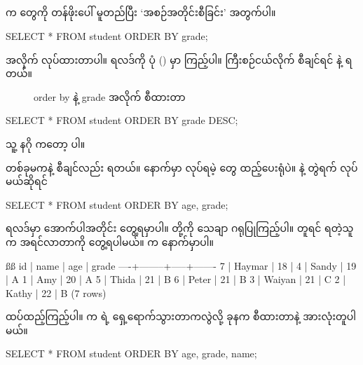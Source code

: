 \subsection*{}
 က  တွေကို  တန်ဖိုးပေါ် မူတည်ပြီး ‘အစဉ်အတိုင်းစီခြင်း’  အတွက်ပါ။
%
\begin{sql}
SELECT * FROM student ORDER BY grade;
\end{sql}
%
 အလိုက်  လုပ်ထားတာပါ။ ရလဒ်ကို ပုံ (\fRefNo{\ref{fig:orderbyasc}}) မှာ ကြည့်ပါ။ ကြီးစဉ်ငယ်လိုက် စီချင်ရင်   နဲ့ ရတယ်။
\begin{figure}[tbh!]
\caption{order by နဲ့ grade အလိုက် စီထားတာ} 
\label{fig:orderbyasc}
\end{figure}
%
\begin{sql}
SELECT * FROM student ORDER BY grade DESC;
\end{sql}
%
သူ့ နဂို  ကတော့   ပါ။ 

 တစ်ခုမကနဲ့  စီချင်လည်း ရတယ်။  နောက်မှာ  လုပ်ရမဲ့  တွေ ထည့်ပေးရုံပဲ။  နဲ့  တွဲရက်  လုပ်မယ်ဆိုရင်
%
\begin{sql}
SELECT * FROM student ORDER BY age, grade;
\end{sql}
%
 ရလဒ်မှာ အောက်ပါအတိုင်း တွေ့ရမှာပါ။  တို့ကို သေချာ ဂရုပြုကြည့်ပါ။  တူရင်  ရတဲ့သူက အရင်လာတာကို တွေ့ရပါမယ်။  က နောက်မှာပါ။
\begin{vbtm}
ßß
 id |  name  | age | grade
----+--------+-----+-------
  7 | Haymar |  18 |
  4 | Sandy  |  19 | A
  1 | Amy    |  20 | A
  5 | Thida  |  21 | B
  6 | Peter  |  21 | B
  3 | Waiyan |  21 | C
  2 | Kathy  |  22 | B
(7 rows)
\end{vbtm}
 ထပ်ထည့်ကြည့်ပါ။   က  ရဲ့ ရှေ့ရောက်သွားတာကလွဲလို့ ခုနက စီထားတာနဲ့ အားလုံးတူပါမယ်။
%
\begin{sql}
SELECT * FROM student ORDER BY age, grade, name;
\end{sql}
%

